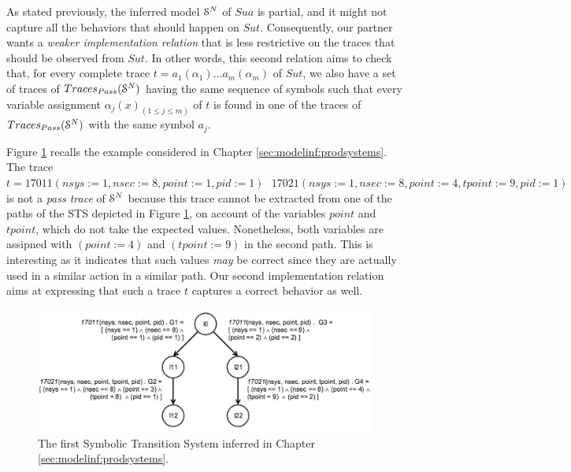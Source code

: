 As stated previously, the inferred model $\EuScript{S}^{N}$ of
$\mathit{Sua}$ is partial, and it might not capture all the
behaviors that should happen on $\mathit{Sut}$. Consequently,
our partner wants a \emph{weaker implementation relation} that is
less restrictive on the traces that should be observed from
$\mathit{Sut}$.  In other words, this second relation aims to
check that, for every complete trace $t=a_1(\alpha_1) \dots
a_m(\alpha_m)$ of $\mathit{Sut}$, we also have a set of traces of
$Traces_{Pass}(\EuScript{S}^{N})$ having the same sequence of
symbols such that every variable assignment $\alpha_j(x)_{(1 \leq
j \leq m)}$ of $t$ is found in one of the traces of
$Traces_{Pass}(\EuScript{S}^{N})$ with the same symbol $a_j$.

\begin{example}
    Figure \ref{fig:sts-ch4} recalls the example considered in
    Chapter \ref{sec:modelinf:prodsystems}. The trace $t =
    17011(nsys:=1, nsec:=8, point:=1, pid:=1)\text{ }
    17021(nsys:=1, nsec:=8, point:=4, tpoint:=9, pid:=1)$ is not
    a \emph{pass trace} of $\EuScript{S}^{N}$ because this trace
    cannot be extracted from one of the paths of the STS depicted
    in Figure \ref{fig:sts-ch4}, on account of the variables
    $point$ and $tpoint$, which do not take the expected values.
    Nonetheless, both variables are assipned with $(point := 4)$
    and $(tpoint := 9)$ in the second path. This is interesting
    as it indicates that such values \emph{may} be correct since
    they are actually used in a similar action in a similar path.
    Our second implementation relation aims at expressing that
    such a trace $t$ captures a correct behavior as well.

    \begin{figure}[ht]
        \begin{center}
            \includegraphics[width=1.0\linewidth]{figures/STS1.png}
        \end{center}

        \caption{The first Symbolic Transition System inferred in
        Chapter \ref{sec:modelinf:prodsystems}.}
        \label{fig:sts-ch4}
    \end{figure}
\end{example}

